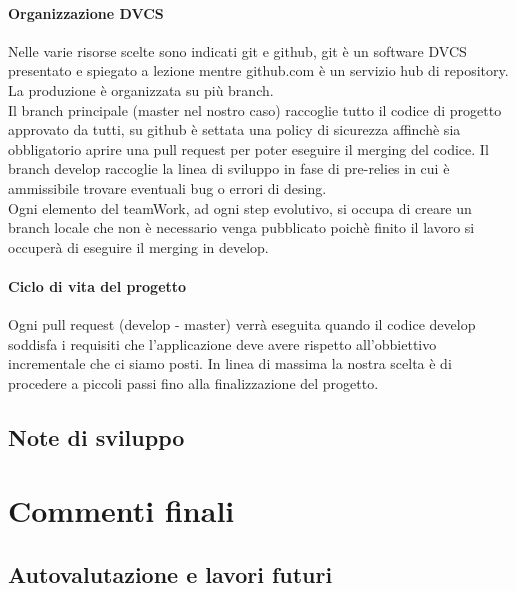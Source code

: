 \documentclass[a4paper,12pt]{report}
\begin{document}
\subsubsection{Organizzazione DVCS}
Nelle varie risorse scelte sono indicati git e github, git è un software DVCS presentato e spiegato a lezione mentre github.com è un servizio
hub di repository.
La produzione è organizzata su più branch.
\\Il branch principale (master nel nostro caso) raccoglie tutto il codice di progetto approvato da tutti, su github è settata una policy
di sicurezza affinchè sia obbligatorio aprire una pull request per poter eseguire il merging del codice.
Il branch develop raccoglie la linea di sviluppo in fase di pre-relies in cui è ammissibile trovare eventuali bug o errori di desing.
\\Ogni elemento del teamWork, ad ogni step evolutivo, si occupa di creare un branch locale che non è necessario venga pubblicato poichè finito
il lavoro si occuperà di eseguire il merging  in develop.
\subsubsection{Ciclo di vita del progetto}
Ogni pull request (develop - master) verrà eseguita quando il codice develop soddisfa i requisiti che l'applicazione deve avere rispetto
all'obbiettivo incrementale che ci siamo posti.
In linea di massima la nostra scelta è di procedere a piccoli passi fino alla finalizzazione del progetto.
\section{Note di sviluppo}
\chapter{Commenti finali}
\section{Autovalutazione e lavori futuri}

\appendix
\end{document}
